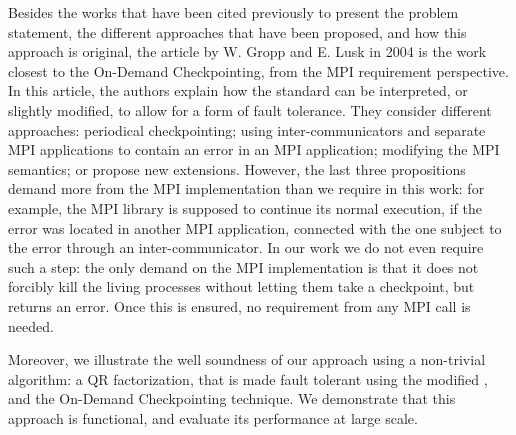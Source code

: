 

Besides the works that have been cited previously to present the
problem statement, the different approaches that have been proposed,
and how this approach is original, the article by W. Gropp and E. Lusk
in 2004 \cite{Gropp:2004:FTM:1080704.1080714} is the work closest to
the On-Demand Checkpointing, from the MPI requirement perspective.  In
this article, the authors explain how the standard can be interpreted,
or slightly modified, to allow for a form of fault tolerance. They
consider different approaches: periodical checkpointing; using
inter-communicators and separate MPI applications to contain an error
in an MPI application; modifying the MPI semantics; or propose new
extensions. However, the last three propositions demand more from the
MPI implementation than we require in this work: for example, the MPI
library is supposed to continue its normal execution, if the error was
located in another MPI application, connected with the one subject to
the error through an inter-communicator. In our work we do not even
require such a step: the only
demand on the MPI implementation is that it does not forcibly kill the
living processes without letting them take a checkpoint, but returns
an error. Once this is ensured, no requirement from any MPI call is
needed.

Moreover, we illustrate the well soundness of our approach using a
non-trivial algorithm: a QR factorization, that is made fault tolerant
using the modified \ompi, and the On-Demand Checkpointing
technique. We demonstrate that this approach is functional, and
evaluate its performance at large scale.
